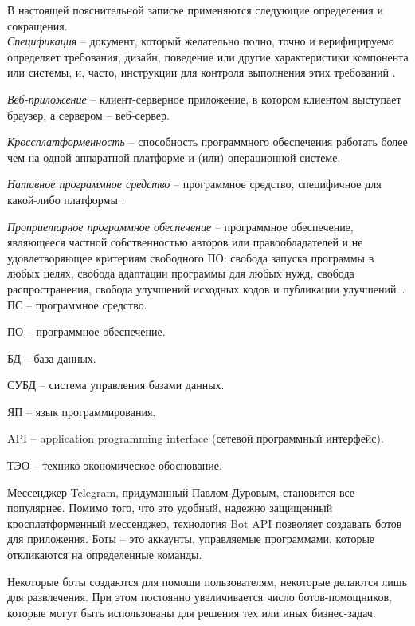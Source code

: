 \label{sec:definitions}

В настоящей пояснительной записке применяются следующие определения и сокращения.
\\

\emph{Спецификация} -- документ, который желательно полно, точно и верифицируемо определяет требования, дизайн, поведение или другие характеристики компонента или системы, и, часто, инструкции для контроля выполнения этих требований \cite{istqb_specification}.

\emph{Веб-приложение} -- клиент-серверное приложение, в котором клиентом выступает браузер, а сервером -- веб-сервер.

\emph{Кроссплатформенность} -- способность программного обеспечения работать более чем на одной аппаратной платформе и (или) операционной системе.

\emph{Нативное программное средство} -- программное средство, специфичное для какой-либо платформы \cite{habr_crossplatform}.

\emph{Проприетарное программное обеспечение} -- программное обеспечение, являющееся частной собственностью авторов или правообладателей и не удовлетворяющее критериям свободного ПО: свобода запуска программы в любых целях, свобода адаптации программы для любых нужд, свобода распространения, свобода улучшений исходных кодов и публикации улучшений~\cite{free_software}.
\\

ПС -- программное средство.

ПО -- программное обеспечение.

БД -- база данных.

СУБД -- система управления базами данных.

ЯП -- язык программирования.

API -- application programming interface (сетевой программный интерфейс).

ТЭО -- технико-экономическое обоснование.


\label{sec:introduction}


Мессенджер Telegram, придуманный Павлом Дуровым, становится все популярнее. Помимо того, что это удобный, надежно защищенный кросплатформенный мессенджер, технология Bot API позволяет создавать ботов для приложения. Боты – это аккаунты, управляемые программами, которые откликаются на определенные команды.

Некоторые боты создаются для помощи пользователям, некоторые делаются лишь для развлечения. При этом постоянно увеличивается число ботов-помощников, которые могут быть использованы для решения тех или иных бизнес-задач.

